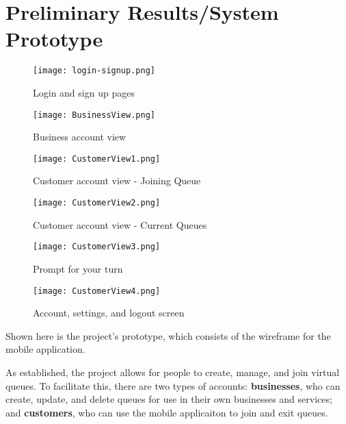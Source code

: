 \chapter{Preliminary Results/System Prototype}

\begin{figure}[h]                
   \centering                    
   \caption{Login and sign up pages}
   \texttt{[image: login-signup.png]}       
    \label{fig:loginsignup}
\end{figure}

\begin{figure}[h]               
   \centering                    
   \caption{Business account view}
   \texttt{[image: BusinessView.png]}       
    \label{fig:businessview}
\end{figure}

\begin{figure}[h]                
   \centering                    
   \caption{Customer account view - Joining Queue}
   \texttt{[image: CustomerView1.png]}       
    \label{fig:joinqueue}
\end{figure}

\begin{figure}[h]                
   \centering                    
   \caption{Customer account view - Current Queues}
   \texttt{[image: CustomerView2.png]}       
    \label{fig:queuecomparison}
\end{figure}

\begin{figure}[h]                
   \centering                    
   \caption{Prompt for your turn}
   \texttt{[image: CustomerView3.png]}       
    \label{fig:queuenotification}
\end{figure}

\begin{figure}[h]                
   \centering                    
   \caption{Account, settings, and logout screen}
   \texttt{[image: CustomerView4.png]}       
    \label{fig:logout}
\end{figure}

Shown here is the project's prototype, which consists of the wireframe for the mobile application. 

As established, the project allows for people to create, manage, and join virtual queues. To facilitate this, there are two types of accounts: \textbf{businesses}, who can create, update, and delete queues for use in their own businesses and services; and \textbf{customers}, who can use the mobile applicaiton to join and exit queues.


